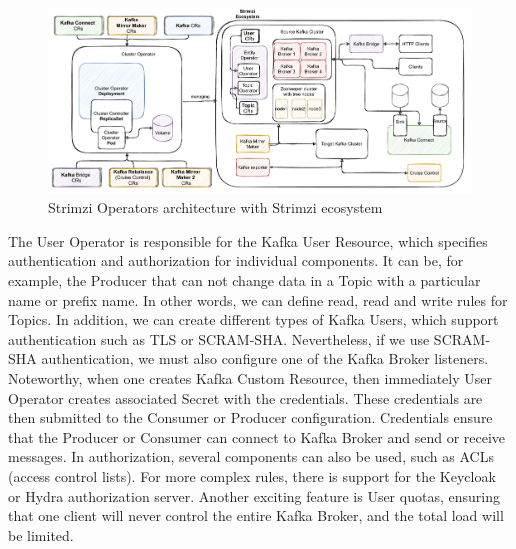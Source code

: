 \begin{figure}[!ht]
    \centering
    \includegraphics[scale=0.60]{obrazky-figures/02-preliminaries/03-strimzi/04-stirmziOperatorsArch.pdf}
    \caption{Strimzi Operators architecture with Strimzi ecosystem}
    \label{03:fig:strimziOperatorsArchitecture}
\end{figure}

The User Operator is responsible for the Kafka User Resource, which specifies authentication and authorization for individual components. It can be, for example, the Producer that can not change data in a Topic with a particular name or prefix name. In other words, we can define read, read and write rules for Topics. In addition, we can create different types of Kafka Users, which support authentication such as TLS or SCRAM-SHA. Nevertheless, if we use SCRAM-SHA authentication, we must also configure one of the Kafka Broker listeners. Noteworthy, when one creates Kafka Custom Resource, then immediately User Operator creates associated Secret with the credentials. These credentials are then submitted to the Consumer or Producer configuration. Credentials ensure that the Producer or Consumer can connect to Kafka Broker and send or receive messages. In authorization, several components can also be used, such as ACLs (access control lists). For more complex rules, there is support for the Keycloak or Hydra authorization server. Another exciting feature is User quotas, ensuring that one client will never control the entire Kafka Broker, and the total load will be limited.


